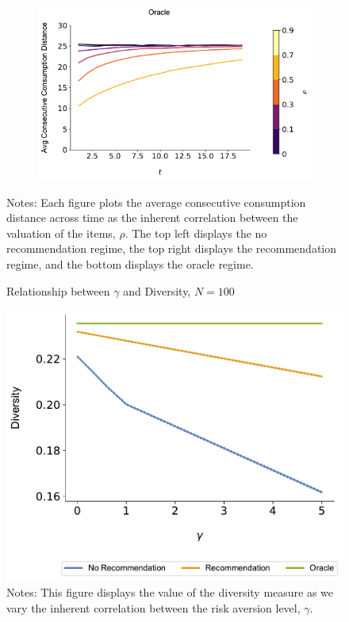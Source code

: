 \documentclass[format=acmsmall, review=true]{acmart}
\begin{document}
\begin{figure}[H]
\begin{subfigure}{.45\textwidth}
\end{subfigure}\\
\begin{subfigure}{.45\textwidth}
\includegraphics[width=\linewidth]{figures/rho_consumption_dist_N_100T_20_omni.pdf}\\
\end{subfigure}
\caption*{\scriptsize Notes: Each figure plots the average consecutive consumption distance across time as the inherent correlation between the valuation of the items, $\rho$. The top left displays the no recommendation regime, the top right displays the recommendation regime, and the bottom displays the oracle regime.}
\label{fig:local_consumption_across_rho}
\end{figure}

\begin{figure}[ht]
\caption{Relationship between $\gamma$ and Diversity, $N = 100$}
\includegraphics[width=.45\linewidth]{figures/gamma_diversity_N_100_T_20}
\caption*{\scriptsize Notes: This figure displays the value of the diversity measure as we vary the inherent correlation between the risk aversion level, $\gamma$.}\label{fig:cor_homo}
\end{figure}

\clearpage
\end{document}
